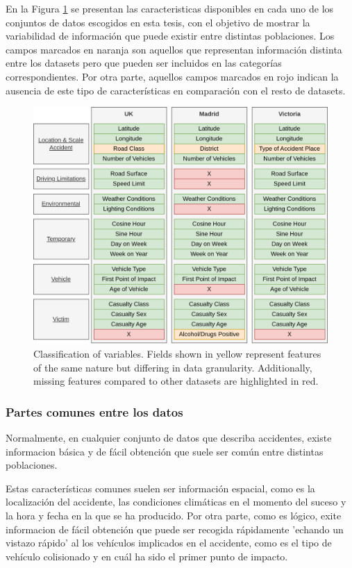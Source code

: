 \documentclass{uathesis-es}
\begin{document}
En la Figura \ref{FeaturesClassification} se presentan las caracteristicas disponibles en cada uno de los conjuntos de datos escogidos en esta tesis, con el objetivo de mostrar la variabilidad de información que puede existir entre distintas poblaciones. Los campos marcados en naranja son aquellos que representan información distinta entre los datasets pero que pueden ser incluidos en las categorías correspondientes. Por otra parte, aquellos campos marcados en rojo indican la ausencia de este tipo de características en comparación con el resto de datasets.

\begin{figure}[H]
    \centering
    \includegraphics[width=14cm]{Figures/Dataset Comparative.png}
    \caption{Classification of variables. Fields shown in yellow represent features of the same nature but differing in data granularity. Additionally, missing features compared to other datasets are highlighted in red.}
    \label{FeaturesClassification}
\end{figure}

\subsubsection{Partes comunes entre los datos}

Normalmente, en cualquier conjunto de datos que describa accidentes, existe informacion básica y de fácil obtención que suele ser común entre distintas poblaciones.

Estas características comunes suelen ser información espacial, como es la localización del accidente, las condiciones climáticas en el momento del suceso y la hora y fecha en la que se ha producido. Por otra parte, como es lógico, exite informacion de fácil obtención que puede ser recogida rápidamente 'echando un vistazo rápido' al los vehículos implicados en el accidente, como es el tipo de vehículo colisionado y en cuál ha sido el primer punto de impacto.
\end{document}

